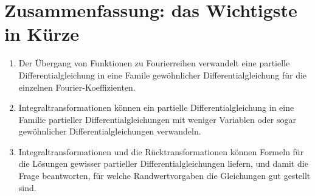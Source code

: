 \section{Zusammenfassung: das Wichtigste in Kürze}
\begin{enumerate}
\item Der Übergang von Funktionen zu Fourierreihen verwandelt
eine partielle Differentialgleichung in eine Famile gewöhnlicher
Differentialgleichung für die einzelnen Fourier-Koeffizienten.
\item Integraltransformationen können ein partielle Differentialgleichung
in eine Familie partieller Differentialgleichungen mit weniger Variablen
oder sogar gewöhnlicher Differentialgleichungen verwandeln.
\item Integraltransformationen und die Rücktransformationen können
Formeln für die Lösungen gewisser partieller Differentialgleichungen
liefern, und damit die Frage beantworten, für welche Randwertvorgaben
die Gleichungen gut gestellt sind.
\end{enumerate}
